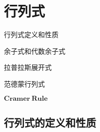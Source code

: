 
\chapter{行列式}
\begin{introduction}
	\item 行列式定义和性质
	\item 余子式和代数余子式
	\item 拉普拉斯展开式
	\item 范德蒙行列式
	\item $\mathbf{Cramer\ Rule}$
\end{introduction}
\section{行列式的定义和性质}
